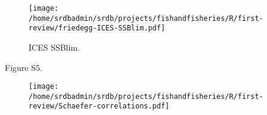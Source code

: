 \documentclass[letterpaper,review,authoryear,12pt]{myelsarticle}
\begin{document}
\begin{appendix}
\begin{figure}
\begin{center}
\texttt{[image: /home/srdbadmin/srdb/projects/fishandfisheries/R/first-review/friedegg-ICES-SSBlim.pdf]}
\end{center}
\caption{ ICES SSBlim.}
\label{fig:icesblim}
\end{figure}


\noindent Figure S5. \\ 

\begin{figure}
\begin{center}
\texttt{[image: /home/srdbadmin/srdb/projects/fishandfisheries/R/first-review/Schaefer-correlations.pdf]}
\end{center}
\caption{ }\label{fig:corr}
\end{figure}







\end{appendix}
\end{document}
